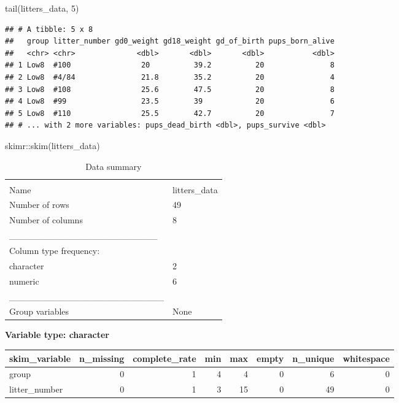\documentclass[
]{article}
\newenvironment{Shaded}{\begin{snugshade}}{\end{snugshade}}
\newcommand{\DecValTok}[1]{\textcolor[rgb]{0.00,0.00,0.81}{#1}}
\newcommand{\FunctionTok}[1]{\textcolor[rgb]{0.00,0.00,0.00}{#1}}
\newcommand{\NormalTok}[1]{#1}
\newcommand{\SpecialCharTok}[1]{\textcolor[rgb]{0.00,0.00,0.00}{#1}}
\begin{document}
\begin{Shaded}
\begin{Highlighting}[]
\FunctionTok{tail}\NormalTok{(litters\_data, }\DecValTok{5}\NormalTok{)}
\end{Highlighting}
\end{Shaded}

\begin{verbatim}
## # A tibble: 5 x 8
##   group litter_number gd0_weight gd18_weight gd_of_birth pups_born_alive
##   <chr> <chr>              <dbl>       <dbl>       <dbl>           <dbl>
## 1 Low8  #100                20          39.2          20               8
## 2 Low8  #4/84               21.8        35.2          20               4
## 3 Low8  #108                25.6        47.5          20               8
## 4 Low8  #99                 23.5        39            20               6
## 5 Low8  #110                25.5        42.7          20               7
## # ... with 2 more variables: pups_dead_birth <dbl>, pups_survive <dbl>
\end{verbatim}

\begin{Shaded}
\begin{Highlighting}[]
\NormalTok{skimr}\SpecialCharTok{::}\FunctionTok{skim}\NormalTok{(litters\_data)}
\end{Highlighting}
\end{Shaded}

\begin{longtable}[]{@{}ll@{}}
\caption{Data summary}\tabularnewline
\toprule
& \\
\midrule
\endfirsthead
\toprule
& \\
\midrule
\endhead
Name & litters\_data \\
Number of rows & 49 \\
Number of columns & 8 \\
\_\_\_\_\_\_\_\_\_\_\_\_\_\_\_\_\_\_\_\_\_\_\_ & \\
Column type frequency: & \\
character & 2 \\
numeric & 6 \\
\_\_\_\_\_\_\_\_\_\_\_\_\_\_\_\_\_\_\_\_\_\_\_\_ & \\
Group variables & None \\
\bottomrule
\end{longtable}

\textbf{Variable type: character}

\begin{longtable}[]{@{}lrrrrrrr@{}}
\toprule
skim\_variable & n\_missing & complete\_rate & min & max & empty &
n\_unique & whitespace \\
\midrule
\endhead
group & 0 & 1 & 4 & 4 & 0 & 6 & 0 \\
litter\_number & 0 & 1 & 3 & 15 & 0 & 49 & 0 \\
\bottomrule
\end{longtable}
\end{document}
